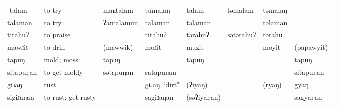\begin{landscape}
\begin{longtable}{*{9}{p{}}}
\text{*}-talam & to try & mantalam & tumalaŋ & talam & təmalam & təmalaŋ &  & \\
\text{*}talaman & to try & ʔantalamun & talaman & təlaman &  & təlaman &  & \\
\text{*}tirahuʔ & to praise &  & tirahuʔ & tərahuʔ & sətərahuʔ & tərahu &  & \\
\text{*}mawɹit & to drill & (mawwik) & moɹit & muzit &  & moyit & (papawyit) & \\
\text{*}tapuŋ & mold; moss & tapuŋ &  & tapuŋ &  &  & tapuŋ & \\
\text{*}sitapuŋan & to get moldy & sətapuŋan & satapuŋan &  &  &  & sitapuŋan & \\
\text{*}giɹaŋ & rust &  & giɹaŋ ``dirt" & (ʔiyaŋ) &  & (ryaŋ) & gyaŋ & \\
\text{*}sigiɹaŋan & to rust; get rusty &  & sagiɹaŋan & (səʔiyaŋan) &  &  & sagyaŋan & \\
\end{longtable}

\end{landscape}
